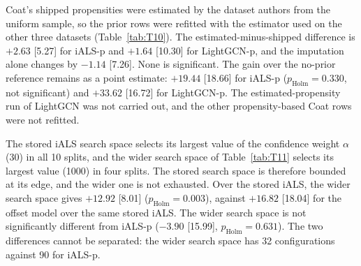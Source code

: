 Coat's shipped propensities were estimated by the dataset authors from the uniform sample, so the prior rows were
refitted with the estimator used on the other three datasets (Table~\ref{tab:T10}). The estimated-minus-shipped
difference is $+2.63$ [5.27] for iALS-p and $+1.64$ [10.30] for LightGCN-p, and the imputation alone changes by $-1.14$
[7.26]. None is significant. The gain over the no-prior reference remains as a point estimate: $+19.44$ [18.66] for
iALS-p ($p_\mathrm{Holm}=0.330$, not significant) and $+33.62$ [16.72] for LightGCN-p. The estimated-propensity run of
LightGCN was not carried out, and the other propensity-based Coat rows were not refitted.



The stored iALS search space selects its largest value of the confidence weight $\alpha$ (30) in all 10 splits, and the
wider search space of Table~\ref{tab:T11} selects its largest value (1000) in four splits. The stored search space is
therefore bounded at its edge, and the wider one is not exhausted. Over the stored iALS, the wider search space gives
$+12.92$ [8.01] ($p_\mathrm{Holm}=0.003$), against $+16.82$ [18.04] for the offset model over the same stored iALS. The
wider search space is not significantly different from iALS-p ($-3.90$ [15.99], $p_\mathrm{Holm}=0.631$). The two
differences cannot be separated: the wider search space has 32 configurations against 90 for iALS-p.



